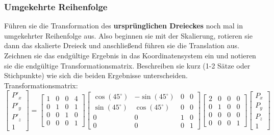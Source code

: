 \documentclass[11pt, a4paper]{article} %
\begin{document}
\begin{figure}[h]
\end{figure}

\newpage
\subsubsection*{Umgekehrte Reihenfolge}
Führen sie die Transformation des \textbf{ursprünglichen Dreieckes} noch mal in umgekehrter Reihenfolge aus. Also beginnen sie mit der Skalierung, rotieren sie dann das skalierte Dreieck und anschließend führen sie die Translation aus. Zeichnen sie das endgültige Ergebnis in das Koordinatensystem ein und notieren sie die endgültige Transformationsmatrix. Beschreiben sie kurz (1-2 Sätze oder Stichpunkte) wie sich die beiden Ergebnisse unterscheiden. \\[0.1cm]
Transformationsmatrix: $\begin{bmatrix}
	P'_x \\ P'_y \\ P'_z \\ 1
\end{bmatrix} = \begin{bmatrix}
	1 & 0 & 0 & 4 \\ 0 & 1 & 0 & 1 \\ 0 & 0 & 1 & 0 \\ 0 & 0 & 0 & 1
\end{bmatrix} \begin{bmatrix}
\cos(45^\circ) & -\sin(45^\circ) & 0 & 0 \\ \sin(45^\circ) & \cos(45^\circ) & 0 & 0 \\ 0 & 0 & 1 & 0 \\ 0 & 0 & 0 & 1
\end{bmatrix} \begin{bmatrix}
2 & 0 & 0 & 0 \\ 0 & 1 & 0 & 0 \\ 0 & 0 & 0 & 0 \\ 0 & 0 & 0 & 1
\end{bmatrix} \begin{bmatrix}
P_x \\ P_y \\ P_z \\ 1
\end{bmatrix}$ \\
\end{document}
